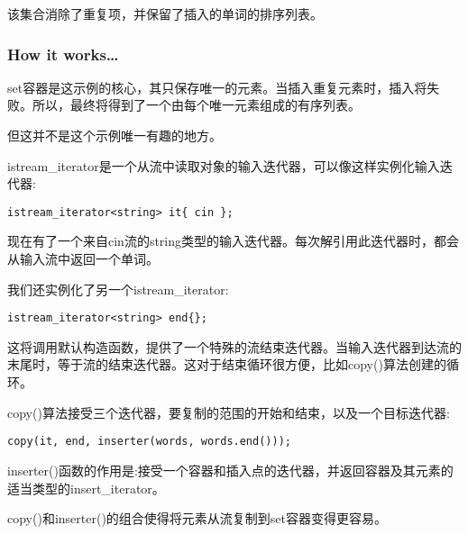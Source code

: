 该集合消除了重复项，并保留了插入的单词的排序列表。

\subsubsection{How it works…}

set容器是这示例的核心，其只保存唯一的元素。当插入重复元素时，插入将失败。所以，最终将得到了一个由每个唯一元素组成的有序列表。

但这并不是这个示例唯一有趣的地方。

istream\_iterator是一个从流中读取对象的输入迭代器，可以像这样实例化输入迭代器:

\begin{lstlisting}[style=styleCXX]
istream_iterator<string> it{ cin };
\end{lstlisting}

现在有了一个来自cin流的string类型的输入迭代器。每次解引用此迭代器时，都会从输入流中返回一个单词。

我们还实例化了另一个istream\_iterator:

\begin{lstlisting}[style=styleCXX]
istream_iterator<string> end{};
\end{lstlisting}

这将调用默认构造函数，提供了一个特殊的流结束迭代器。当输入迭代器到达流的末尾时，等于流的结束迭代器。这对于结束循环很方便，比如copy()算法创建的循环。

copy()算法接受三个迭代器，要复制的范围的开始和结束，以及一个目标迭代器:

\begin{lstlisting}[style=styleCXX]
copy(it, end, inserter(words, words.end()));
\end{lstlisting}

inserter()函数的作用是:接受一个容器和插入点的迭代器，并返回容器及其元素的适当类型的insert\_iterator。

copy()和inserter()的组合使得将元素从流复制到set容器变得更容易。

